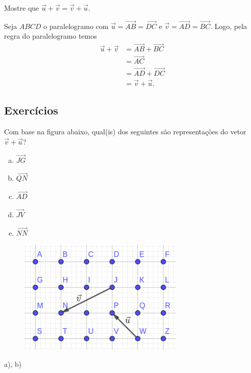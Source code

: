 \begin{exeresol}\label{exeresol:vetor_comuta_adicao}
  Mostre que $\vec{u} + \vec{v} = \vec{v} + \vec{u}$.
\end{exeresol}
\begin{resol}
  Seja $ABCD$ o paralelogramo com $\vec{u} = \overrightarrow{AB} = \overrightarrow{DC}$ e $\vec{v} = \overrightarrow{AD} = \overrightarrow{BC}$. Logo, pela regra do paralelogramo temos
  \begin{align}
    \vec{u} + \vec{v} &= \overrightarrow{AB} + \overrightarrow{BC} \\
                      &= \overrightarrow{AC} \\
                      &= \overrightarrow{AD} + \overrightarrow{DC} \\
                      &= \vec{v} + \vec{u}.
  \end{align}
\end{resol}

\subsection*{Exercícios}

\begin{exer}
  Com base na figura abaixo, qual(is) dos seguintes são representações do vetor $\overrightarrow{v}+\overrightarrow{u}$?
  \begin{enumerate}[a)]
  \item $\overrightarrow{JG}$
  \item $\overrightarrow{QN}$
  \item $\overrightarrow{AD}$
  \item $\overrightarrow{JV}$
  \item $\overrightarrow{NN}$
  \end{enumerate}
  \begin{figure}[H]
    \centering
    \includegraphics[width=0.7\textwidth]{./cap_vetor/dados/fig_exer_op_basicas/fig_vec_soma}
  \end{figure}
\end{exer}
\begin{resp}
  a), b)
\end{resp}

